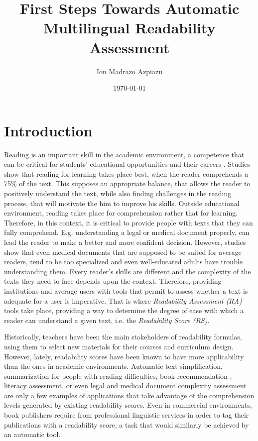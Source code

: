 \documentclass[12pt]{article}
\title{First Steps Towards Automatic Multilingual Readability Assessment}
\author{Ion Madrazo Azpiazu}
\date{\today}
\begin{document}
\maketitle
\section{Introduction}

Reading is an important skill in the academic environment, a competence that can be critical for students' educational opportunities and their careers \cite{robinson2000issues}. Studies \cite{lennon2004lexile} show that reading for learning takes place best, when the reader comprehends a 75\% of the text. This supposes an appropriate balance, that allows the reader to positively understand the text, while also finding challenges in the reading process, that will motivate the him to improve his skills. Outside educational environment, reading takes place for comprehension rather that for learning. Therefore, in this context, it is critical to provide people with texts that they can fully comprehend. E.g. understanding a legal or medical document properly, can lead the reader to make a better and more confident decision. However, studies\cite{medicalReadability1,medicalReadability2,medicalReadability3}  show that even medical documents that are supposed to be suited for average readers, tend to be too specialized and even well-educated adults have trouble understanding them.
Every reader's skills are different and the complexity of the texts they need to face depends upon the context. Therefore, providing institutions and average users with tools that permit to assess whether a text is adequate for a user is imperative. That is where \textit{Readability Assessment (RA)} tools take place, providing a way to determine the degree of ease with which a reader can understand a given text, i.e. the \textit{Readability Score (RS)}.



 Historically, teachers have been the main stakeholders of readability formulas, using them to select new materials for their courses and curriculum design. However, lately, readability scores have been known to have more applicability than the ones in academic environments. Automatic text simplification\cite{textsimplification1,textsimplification2}, summarization for people with reading difficulties\cite{textsimplificationWithDisabilities1}, book recommendation \cite{pera2014automating}, literacy assessment\cite{literacy1}, or even legal\cite{legalreadability} and medical document complexity assessment\cite{medicalReadability1,medicalReadability2,medicalReadability3}  are only a few examples of applications that take advantage of the comprehension levels generated by existing readability scores. Even in commercial environments, book publishers require from professional linguistic services in order to tag their publications with a readability score, a task that would similarly be achieved by an automatic tool.
\end{document}
